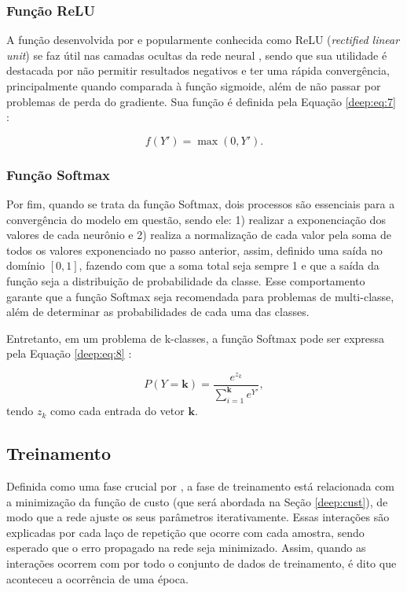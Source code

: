 \subsubsection{Função ReLU}
A função desenvolvida por \cite{Hahnioser2000} e popularmente conhecida como ReLU (\textit{rectified linear unit}) se faz útil nas camadas ocultas da rede neural \cite{Goodfellow2016}, sendo que sua utilidade é destacada por não permitir resultados negativos \cite{Dahl2013} e ter uma rápida convergência, principalmente quando comparada à função sigmoide, além de não passar por problemas de perda do gradiente. Sua função é definida pela Equação \ref{deep:eq:7} \cite{Hahnioser2000}:

\begin{equation}
    \label{deep:eq:7}
    f(Y') = \max(0,Y').
\end{equation}

\subsubsection{Função Softmax}
\label{deep:soft}
Por fim, quando se trata da função Softmax, dois processos são essenciais para a convergência do modelo em questão, sendo ele: 1) realizar a exponenciação dos valores de cada neurônio e 2) realiza a normalização de cada valor pela soma de todos os valores exponenciado no passo anterior, assim, definido uma saída no domínio $[0,1]$, fazendo com que a soma total seja sempre 1 \cite{kotu2018data} e que a saída da função seja a distribuição de probabilidade da classe. Esse comportamento garante que a função Softmax seja recomendada para problemas de multi-classe, além de determinar as probabilidades de cada uma das classes.

Entretanto, em um problema de k-classes, a função Softmax pode ser expressa pela Equação \ref{deep:eq:8} \cite{kotu2018data}:

\begin{equation}
    \label{deep:eq:8}
    P(Y = \boldsymbol{k}) = \frac{e^{z_k}}{\sum_{i=1}^{\boldsymbol{k}} e^{Y'}},
\end{equation}
tendo $z_k$ como cada entrada do vetor $\boldsymbol{k}$.


\subsection{Treinamento}
\label{deep:train}

Definida como uma fase crucial por \cite{ponti2018funciona}, a fase de treinamento está relacionada com a minimização da função de custo (que será abordada na Seção \ref{deep:cust}), de modo que a rede ajuste os seus parâmetros iterativamente. Essas interações são explicadas por cada laço de repetição que ocorre com cada amostra, sendo esperado que o erro propagado na rede seja minimizado. Assim, quando as interações ocorrem com por todo o conjunto de dados de treinamento, é dito que aconteceu a ocorrência de uma época.

